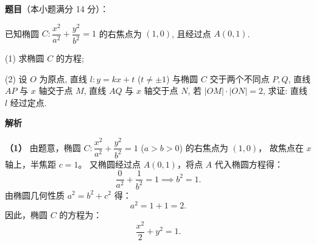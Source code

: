 \begin{answer}

\textbf{题目}（本小题满分 14 分）：

已知椭圆 $C: \dfrac{x^2}{a^2} + \dfrac{y^2}{b^2} = 1$ 的右焦点为 $(1, 0)$, 且经过点 $A(0, 1)$.

(1) 求椭圆 $C$ 的方程;

(2) 设 $O$ 为原点, 直线 $l: y = kx + t$ ($t \neq \pm 1$) 与椭圆 $C$ 交于两个不同点 $P, Q$, 直线 $AP$ 与 $x$ 轴交于点 $M$, 直线 $AQ$ 与 $x$ 轴交于点 $N$, 若 $|OM| \cdot |ON| = 2$, 求证: 直线 $l$ 经过定点.

\textbf{解析}

\textbf{（1）}
由题意，椭圆 $C: \dfrac{x^2}{a^2} + \dfrac{y^2}{b^2} = 1$ ($a > b > 0$) 的右焦点为 $(1, 0)$，
故焦点在 $x$ 轴上，半焦距 $c = 1$。
又椭圆经过点 $A(0, 1)$，将点 $A$ 代入椭圆方程得：
\nopagebreak[4]
\[\dfrac{0}{a^2} + \dfrac{1}{b^2} = 1 \implies b^2 = 1.\]
由椭圆几何性质 $a^2 = b^2 + c^2$ 得：
\nopagebreak[4]
\[a^2 = 1 + 1 = 2.\]
因此，椭圆 $C$ 的方程为：
\nopagebreak[4]
\[\dfrac{x^2}{2} + y^2 = 1.\]


\end{answer}
